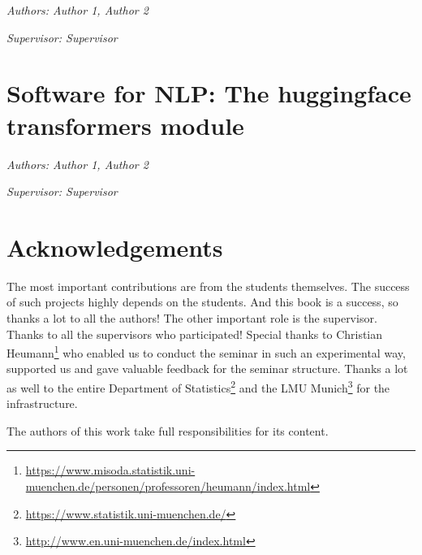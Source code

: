\documentclass[]{krantz}
\renewcommand{\href}[2]{#2\footnote{\url{#1}}}
\begin{document}
\emph{Authors: Author 1, Author 2}

\emph{Supervisor: Supervisor}

\hypertarget{software-for-nlp-the-huggingface-transformers-module}{%
\chapter{Software for NLP: The huggingface transformers module}\label{software-for-nlp-the-huggingface-transformers-module}}

\emph{Authors: Author 1, Author 2}

\emph{Supervisor: Supervisor}

\hypertarget{acknowledgements}{%
\chapter{Acknowledgements}\label{acknowledgements}}

The most important contributions are from the students themselves.
The success of such projects highly depends on the students.
And this book is a success, so thanks a lot to all the authors!
The other important role is the supervisor.
Thanks to all the supervisors who participated!
Special thanks to \href{https://www.misoda.statistik.uni-muenchen.de/personen/professoren/heumann/index.html}{Christian Heumann} who enabled us to conduct the seminar in such an experimental way, supported us and gave valuable feedback for the seminar structure.
Thanks a lot as well to the entire \href{https://www.statistik.uni-muenchen.de/}{Department of Statistics} and the \href{http://www.en.uni-muenchen.de/index.html}{LMU Munich} for the infrastructure.

The authors of this work take full responsibilities for its content.



\backmatter
\printindex
\end{document}
